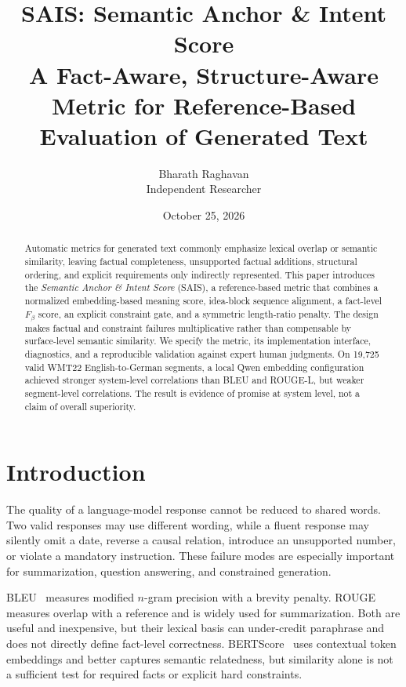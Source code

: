 \documentclass[11pt]{article}
\title{SAIS: Semantic Anchor \& Intent Score\\
\large A Fact-Aware, Structure-Aware Metric for Reference-Based Evaluation of Generated Text}
\author{Bharath Raghavan\\Independent Researcher}
\date{October 25, 2026}
\begin{document}
\maketitle

\begin{abstract}
Automatic metrics for generated text commonly emphasize lexical overlap or
semantic similarity, leaving factual completeness, unsupported factual
additions, structural ordering, and explicit requirements only indirectly
represented. This paper introduces the \emph{Semantic Anchor \& Intent Score}
(SAIS), a reference-based metric that combines a normalized embedding-based
meaning score, idea-block sequence alignment, a fact-level $F_\beta$ score,
an explicit constraint gate, and a symmetric length-ratio penalty. The design
makes factual and constraint failures multiplicative rather than compensable by
surface-level semantic similarity. We specify the metric, its implementation
interface, diagnostics, and a reproducible validation against expert human
judgments. On 19,725 valid WMT22 English-to-German segments, a local Qwen
embedding configuration achieved stronger system-level correlations than BLEU
and ROUGE-L, but weaker segment-level correlations. The result is evidence of
promise at system level, not a claim of overall superiority.
\end{abstract}

\section{Introduction}

The quality of a language-model response cannot be reduced to shared words.
Two valid responses may use different wording, while a fluent response may
silently omit a date, reverse a causal relation, introduce an unsupported
number, or violate a mandatory instruction. These failure modes are especially
important for summarization, question answering, and constrained generation.

BLEU~\citep{papineni2002bleu} measures modified $n$-gram precision with a
brevity penalty. ROUGE~\citep{lin2004rouge} measures overlap with a reference
and is widely used for summarization. Both are useful and inexpensive, but
their lexical basis can under-credit paraphrase and does not directly define
fact-level correctness. BERTScore~\citep{zhang2020bertscore} uses contextual
token embeddings and better captures semantic relatedness, but similarity alone
is not a sufficient test for required facts or explicit hard constraints.
\end{document}
